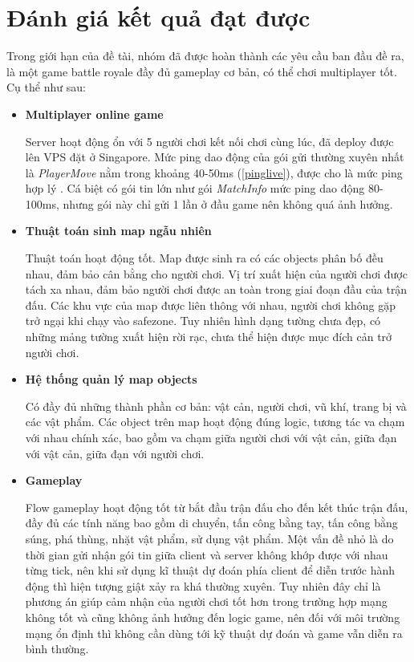 \documentclass[12pt,a4paper]{article}
\begin{document}
  \section{Đánh giá kết quả đạt được}
  Trong giới hạn của đề tài, nhóm đã được hoàn thành các yêu cầu ban đầu đề ra, là một game battle royale đầy đủ gameplay cơ bản, có thể chơi multiplayer tốt. Cụ thể như sau:
  \begin{itemize}
      \item \textbf{Multiplayer online game}
      
      Server hoạt động ổn với 5 người chơi kết nối chơi cùng lúc, đã deploy được lên VPS đặt ở Singapore. Mức ping dao động của gói gửi thường xuyên nhất là \textit{PlayerMove} nằm trong khoảng 40-50ms (\ref{pinglive}), được cho là mức ping hợp lý \footnotemark. Cá biệt có gói tin lớn như gói \textit{MatchInfo} mức ping dao động 80-100ms, nhưng gói này chỉ gửi 1 lần ở đầu game nên không quá ảnh hưởng.

      \item \textbf{Thuật toán sinh map ngẫu nhiên}
      
      Thuật toán hoạt động tốt. Map được sinh ra có các objects phân bố đều nhau, đảm bảo cân bằng cho người chơi. Vị trí xuất hiện của người chơi được tách xa nhau, đảm bảo người chơi được an toàn trong giai đoạn đầu của trận đấu. Các khu vực của map được liên thông với nhau, người chơi không gặp trở ngại khi chạy vào safezone. Tuy nhiên hình dạng tường chưa đẹp, có những mảng tường xuất hiện rời rạc, chưa thể hiện được mục đích cản trở người chơi.
      
      \item \textbf{Hệ thống quản lý map objects}
      
      Có đầy đủ những thành phần cơ bản: vật cản, người chơi, vũ khí, trang bị và các vật phẩm. Các object trên map hoạt động đúng logic, tương tác va chạm với nhau chính xác, bao gồm va chạm giữa người chơi với vật cản, giữa đạn với vật cản, giữa đạn với người chơi.
      
      \item \textbf{Gameplay}
      
      Flow gameplay hoạt động tốt từ bắt đầu trận đấu cho đến kết thúc trận đấu, đầy đủ các tính năng bao gồm di chuyển, tấn công bằng tay, tấn công bằng súng, phá thùng, nhặt vật phẩm, sử dụng vật phẩm. Một vấn đề nhỏ là do thời gian gửi nhận gói tin giữa client và server không khớp được với nhau từng tick, nên khi sử dụng kĩ thuật dự đoán phía client để diễn trước hành động thì hiện tượng giật xảy ra khá thường xuyên. Tuy nhiên đây chỉ là phương án giúp cảm nhận của người chơi tốt hơn trong trường hợp mạng không tốt và cũng không ảnh hưởng đến logic game, nên đối với môi trường mạng ổn định thì không cần dùng tới kỹ thuật dự đoán và game vẫn diễn ra bình thường.
      

\end{itemize}
\end{document}
